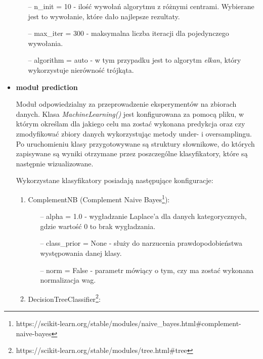 \documentclass[polish,12pt]{aghthesis}
\begin{document}
\begin{itemize}
\begin{itemize}
    \item[--] n\_init = 10 - ilość wywołań algorytmu z różnymi centrami. Wybierane jest to wywołanie, które dało najlepsze rezultaty.
    
    \item[--] max\_iter = 300 - maksymalna liczba iteracji dla pojedynczego wywołania.
    
    \item[--] algorithm = auto - w tym przypadku jest to algorytm \textit{elkan}, który wykorzystuje nierówność trójkąta.

\end{itemize}
    
    \item \textbf{moduł prediction}
    
    Moduł odpowiedzialny za przeprowadzenie eksperymentów na zbiorach danych. Klasa \textit{MachineLearning()} jest konfigurowana za pomocą pliku, w którym określam dla jakiego celu ma zostać wykonana predykcja oraz czy zmodyfikować zbiory danych wykorzystując metody under- i oversamplingu. Po uruchomieniu klasy przygotowywane są struktury słownikowe, do których zapisywane są wyniki otrzymane przez poszczególne klasyfikatory, które są następnie wizualizowane. 
    
    Wykorzystane klasyfikatory posiadają następujące konfiguracje:
    \begin{enumerate}
        \item ComplementNB (Complement Naive Bayes\footnote{https://scikit-learn.org/stable/modules/naive\_bayes.html\#complement-naive-bayes}):
            \begin{itemize}
                \setlength\itemsep{0,1em}
                \item[--] alpha = 1.0 -  wygładzanie Laplace'a dla danych kategorycznych, gdzie wartość 0 to brak wygładzania.
                
                \item[--] class\_prior = None - służy do narzucenia prawdopodobieństwa występowania danej klasy.
                
                \item[--] norm = False - parametr mówiący o tym, czy ma zostać wykonana normalizacja wag.
            \end{itemize}
        
        \item DecisionTreeClassifier\footnote{https://scikit-learn.org/stable/modules/tree.html\#tree}:


\end{enumerate}
\end{itemize}
\end{document}
